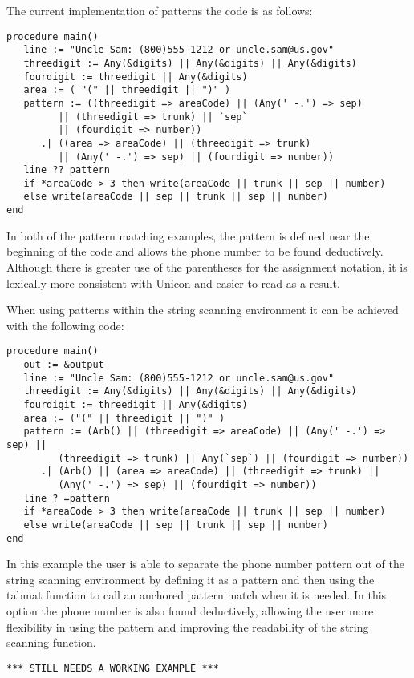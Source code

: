 \documentclass{article}
\begin{document}
The current implementation of patterns the code is as follows:
\begin{verbatim}
procedure main()
   line := "Uncle Sam: (800)555-1212 or uncle.sam@us.gov"
   threedigit := Any(&digits) || Any(&digits) || Any(&digits)
   fourdigit := threedigit || Any(&digits)
   area := ( "(" || threedigit || ")" )
   pattern := ((threedigit => areaCode) || (Any(' -.') => sep) 
         || (threedigit => trunk) || `sep` 
         || (fourdigit => number))
      .| ((area => areaCode) || (threedigit => trunk) 
         || (Any(' -.') => sep) || (fourdigit => number))
   line ?? pattern
   if *areaCode > 3 then write(areaCode || trunk || sep || number) 
   else write(areaCode || sep || trunk || sep || number)
end
\end{verbatim}
In both of the pattern matching examples, the pattern is defined near the beginning of the code and allows the phone number to be found deductively. Although there is greater use of the parentheses for the assignment notation, it is lexically more consistent with Unicon and easier to read as a result.  

When using patterns within the string scanning environment it can be achieved with the following code:
\begin{verbatim}
procedure main()
   out := &output
   line := "Uncle Sam: (800)555-1212 or uncle.sam@us.gov"
   threedigit := Any(&digits) || Any(&digits) || Any(&digits)
   fourdigit := threedigit || Any(&digits)
   area := ("(" || threedigit || ")" )
   pattern := (Arb() || (threedigit => areaCode) || (Any(' -.') => sep) || 
         (threedigit => trunk) || Any(`sep`) || (fourdigit => number)) 
      .| (Arb() || (area => areaCode) || (threedigit => trunk) || 
         (Any(' -.') => sep) || (fourdigit => number))
   line ? =pattern 
   if *areaCode > 3 then write(areaCode || trunk || sep || number)
   else write(areaCode || sep || trunk || sep || number)
end
\end{verbatim}
In this example the user is able to separate the phone number pattern out of the string scanning environment by defining it as a pattern and then using the tabmat function to call an anchored pattern match when it is needed.  In this option the phone number is also found deductively, allowing the user more flexibility in using the pattern and improving the readability of the string scanning function.

\begin{verbatim}
*** STILL NEEDS A WORKING EXAMPLE ***
\end{verbatim}
\end{document}
